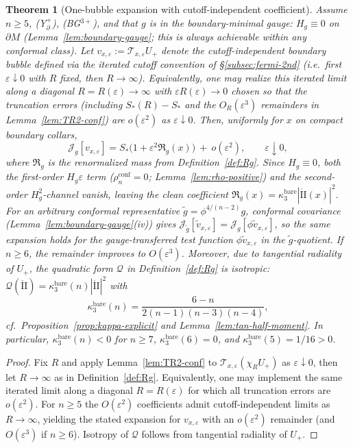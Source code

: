 \documentclass[11pt,reqno,a4paper]{amsart}
\numberwithin{equation}{section}
\theoremstyle{plain}
\newtheorem{theorem}{Theorem}[section]
\theoremstyle{remark}
\theoremstyle{plain}
\begin{document}
\begin{theorem}[One-bubble expansion with cutoff-independent coefficient]\label{thm:onebubble-quant}
Assume $n\ge5$, \textup{(Y$^+_{\partial}$)}, \textup{(BG$^{3+}$)}, and that $g$ is in the
boundary-minimal gauge: $H_g\equiv0$ on $\partial M$
(Lemma~\ref{lem:boundary-gauge}; this is always achievable within any conformal class).
Let $v_{x,\varepsilon}:=\mathcal T_{x,\varepsilon}U_+$ denote the cutoff-independent boundary bubble defined
via the iterated cutoff convention of \S\ref{subsec:fermi-2nd} (i.e.\ first $\varepsilon\downarrow0$ with $R$ fixed, then $R\to\infty$).
Equivalently, one may realize this iterated limit along a diagonal $R=R(\varepsilon)\to\infty$ with $\varepsilon R(\varepsilon)\to0$
chosen so that the truncation errors (including $S_\ast(R)-S_\ast$ and the $O_R(\varepsilon^3)$ remainders in Lemma~\ref{lem:TR2-conf})
are $o(\varepsilon^2)$ as $\varepsilon\downarrow0$.
Then, uniformly for $x$ on compact boundary collars,
\[
\mathcal J_g[v_{x,\varepsilon}]
= S_\ast\Big(1
+\varepsilon^2\mathfrak R_g(x)\Big)\ +\ o(\varepsilon^2),
\qquad \varepsilon\downarrow0,
\]
where $\mathfrak R_g$ is the renormalized mass from Definition~\ref{def:Rg}.
Since $H_g\equiv0$, both the first-order $H_g\varepsilon$ term
($\rho_n^{\mathrm{conf}}=0$; Lemma~\ref{lem:rho-positive})
and the second-order $H_g^2$-channel vanish, leaving
the clean coefficient $\mathfrak R_g(x)=\kappa_3^{\mathrm{bare}}|\mathring{\mathrm{II}}(x)|^2$.
For an arbitrary conformal representative $\tilde g = \phi^{4/(n-2)}g$, conformal
covariance (Lemma~\ref{lem:boundary-gauge}(iv)) gives
$\mathcal J_{\tilde g}[\tilde v_{x,\varepsilon}]
=\mathcal J_g[\phi\tilde v_{x,\varepsilon}]$,
so the same expansion holds for the gauge-transferred test function
$\phi\tilde v_{x,\varepsilon}$ in the $\tilde g$-quotient.
If $n\ge6$, the remainder improves to $O(\varepsilon^3)$. Moreover, due to tangential radiality of $U_+$, the quadratic form $\mathcal Q$ in Definition~\ref{def:Rg} is isotropic:
 $\mathcal Q(\mathring{\mathrm{II}})=\kappa_3^{\mathrm{bare}}(n)|\mathring{\mathrm{II}}|^2$ with
 \[
 \kappa_3^{\mathrm{bare}}(n)=\frac{6-n}{2(n-1)(n-3)(n-4)},
 \]
 cf.\ Proposition~\ref{prop:kappa-explicit} and Lemma~\ref{lem:tan-half-moment}.
 In particular, $\kappa_3^{\mathrm{bare}}(n)<0$ for $n\ge7$,
 $\kappa_3^{\mathrm{bare}}(6)=0$, and $\kappa_3^{\mathrm{bare}}(5)=1/16>0$.
\end{theorem}


\begin{proof}
Fix $R$ and apply Lemma~\ref{lem:TR2-conf} to $\mathcal T_{x,\varepsilon}(\chi_{R}U_+)$ as $\varepsilon\downarrow0$, then let $R\to\infty$
as in Definition~\ref{def:Rg}. Equivalently, one may implement the same iterated limit along a diagonal $R=R(\varepsilon)$ for which all truncation
errors are $o(\varepsilon^2)$.
For $n\ge5$ the $O(\varepsilon^2)$ coefficients admit cutoff-independent limits as $R\to\infty$,
yielding the stated expansion for $v_{x,\varepsilon}$ with an $o(\varepsilon^2)$ remainder (and $O(\varepsilon^3)$ if $n\ge6$).
Isotropy of $\mathcal Q$ follows from tangential radiality of $U_+$.
\end{proof}
\end{document}
